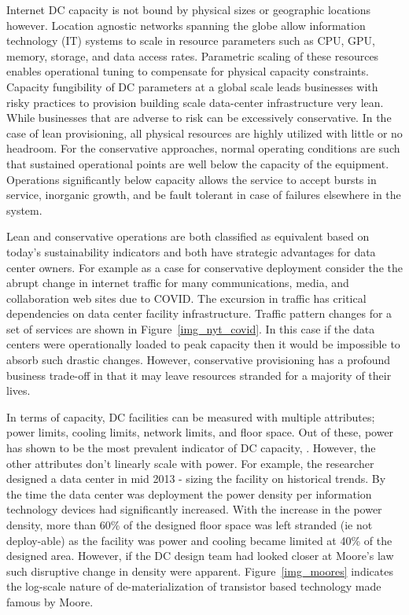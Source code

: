     Internet DC capacity is not bound by physical sizes or geographic locations however. Location agnostic networks spanning the globe allow information technology (IT) systems to scale in resource parameters such as CPU, GPU, memory, storage, and data access rates. Parametric scaling of these resources enables operational tuning to compensate for physical capacity constraints. Capacity fungibility of DC parameters at a global scale leads businesses with risky practices to provision building scale data-center infrastructure very lean. While businesses that are adverse to risk can be excessively conservative. In the case of lean provisioning, all physical resources are highly utilized with little or no headroom. For the conservative approaches, normal operating conditions are such that sustained operational points are well below the capacity of the equipment. Operations significantly below capacity allows the service to accept bursts in service, inorganic  growth, and be fault tolerant in case of failures elsewhere in the system. 
    
    Lean and conservative operations are both classified as equivalent based on today's sustainability indicators and both have strategic advantages for data center owners. For example as a case for conservative deployment consider the the abrupt change in internet traffic for many communications, media, and collaboration web sites due to COVID. The excursion in traffic has critical dependencies on data center facility infrastructure.  Traffic pattern changes for a set of services are shown in Figure~\ref{img_nyt_covid}. In this case if the data centers were operationally loaded to peak capacity then it would be impossible to absorb such drastic changes. However, conservative provisioning has a profound business trade-off in that it may leave resources stranded for a majority of their lives. 
    
    
    
    In terms of capacity, DC facilities can be measured with multiple attributes; power limits, cooling limits, network limits, and floor space. Out of these, power has shown to be the most prevalent indicator of DC capacity, \cite{barroso18}. However, the other attributes don't linearly scale with power. For example, the researcher designed a data center in mid 2013 - sizing the facility on historical trends. By the time the data center was deployment the power density per information technology devices had significantly increased. With the increase in the power density, more than 60\% of the designed floor space was left stranded (ie not deploy-able) as the facility was power and cooling became limited at 40\% of the designed area. However, if the DC design team had looked closer at Moore's law such disruptive change in density were apparent. Figure~\ref{img_moores} indicates the log-scale nature of de-materialization of transistor based technology made famous by Moore.
    
